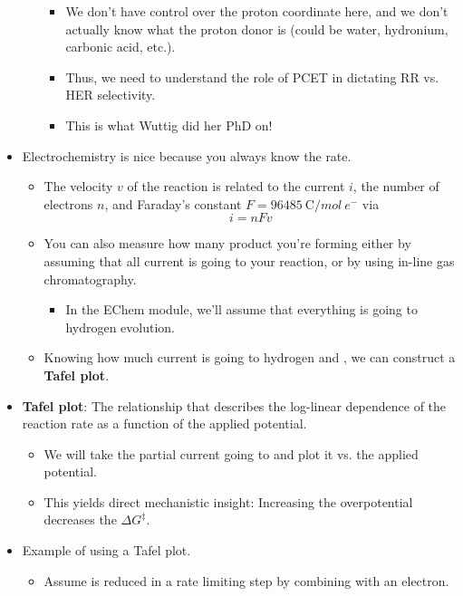 \documentclass[../notes.tex]{subfiles}
\begin{document}
\begin{itemize}
\begin{itemize}
\begin{itemize}
            \item We don't have control over the proton coordinate here, and we don't actually know what the proton donor is (could be water, hydronium, carbonic acid, etc.).
            \item Thus, we need to understand the role of PCET in dictating RR vs. HER selectivity.
            \item This is what Wuttig did her PhD on!
        \end{itemize}
    \end{itemize}
    \item Electrochemistry is nice because you always know the rate.
    \begin{itemize}
        \item The velocity $v$ of the reaction is related to the current $i$, the number of electrons $n$, and Faraday's constant $F=\SI{96485}{\coulomb\per mol\ e^-}$ via
        \begin{equation*}
            i = nFv
        \end{equation*}
        \item You can also measure how many product you're forming either by assuming that all current is going to your reaction, or by using in-line gas chromatography.
        \begin{itemize}
            \item In the EChem module, we'll assume that everything is going to hydrogen evolution.
        \end{itemize}
        \item Knowing how much current is going to hydrogen and , we can construct a \textbf{Tafel plot}.
    \end{itemize}
    \item \textbf{Tafel plot}: The relationship that describes the log-linear dependence of the reaction rate as a function of the applied potential.
    \begin{itemize}
        \item We will take the partial current going to  and plot it vs. the applied potential.
        \item This yields direct mechanistic insight: Increasing the overpotential decreases the $\Delta G^\ddagger$.
    \end{itemize}
    \item Example of using a Tafel plot.
    \begin{itemize}
        \item Assume  is reduced in a rate limiting step by combining with an electron.

\end{itemize}
\end{itemize}
\end{document}
